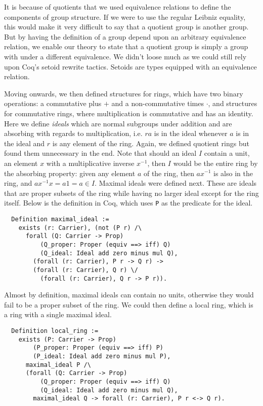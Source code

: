 \documentclass{article}
\begin{document}
It is because of quotients that we used equivalence relations to define the
components of group structure. If we were to use the regular Leibniz equality,
this would make it very difficult to say that a quotient group is another
group. But by having the definition of a group depend upon an arbitrary
equivalence relation, we enable our theory to state that a quotient group is
simply a group with under a different equivalence. We didn't loose much as we
could still rely upon Coq's setoid rewrite tactics. Setoids are types equipped
with an equivalence relation.

Moving onwards, we then defined structures for rings, which have two binary
operations: a commutative plus \(+\) and a non-commutative times \(\cdot\), and
structures for commutative rings, where multiplication is commutative and has
an identity. Here we define \emph{ideals} which are normal subgroups under
addition and are absorbing with regards to multiplication, i.e. \(r a\) is in
the ideal whenever \(a\) is in the ideal and \(r\) is any element of the ring.
Again, we defined quotient rings but found them unnecessary in the end. Note
that should an ideal \(I\) contain a unit, an element \(x\) with a
multiplicative inverse \(x^{-1}\), then \(I\) would be the entire ring by the
absorbing property: given any element \(a\) of the ring, then \(a x^{-1}\) is
also in the ring, and \(a x^{-1} x = a 1 = a\in I\). Maximal ideals were
defined next. These are ideals that are proper subsets of the ring while having
no larger ideal except for the ring itself. Below is the definition in Coq,
which uses \texttt{P} as the predicate for the ideal.
\begin{verbatim}
  Definition maximal_ideal :=
    exists (r: Carrier), (not (P r) /\
      forall (Q: Carrier -> Prop)
          (Q_proper: Proper (equiv ==> iff) Q)
          (Q_ideal: Ideal add zero minus mul Q),
        (forall (r: Carrier), P r -> Q r) ->
        (forall (r: Carrier), Q r) \/
          (forall (r: Carrier), Q r -> P r)).
\end{verbatim}
Almost by definition, maximal ideals can contain no units, otherwise they would
fail to be a proper subset of the ring. We could then define a local ring,
which is a ring with a single maximal ideal.
\begin{verbatim}
  Definition local_ring :=
    exists (P: Carrier -> Prop)
        (P_proper: Proper (equiv ==> iff) P)
        (P_ideal: Ideal add zero minus mul P),
      maximal_ideal P /\
      (forall (Q: Carrier -> Prop)
          (Q_proper: Proper (equiv ==> iff) Q)
          (Q_ideal: Ideal add zero minus mul Q),
        maximal_ideal Q -> forall (r: Carrier), P r <-> Q r).
\end{verbatim}
\end{document}
